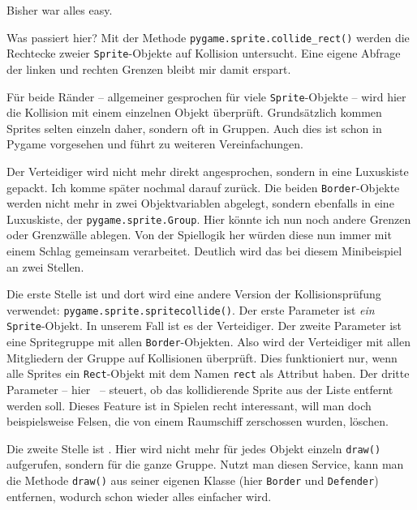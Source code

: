 Bisher war alles easy. 


Was passiert hier? Mit der Methode \texttt{pygame.sprite.collide\_rect()} werden die Rechtecke zweier \texttt{Sprite}-Objekte auf Kollision untersucht. Eine eigene Abfrage der linken und rechten Grenzen bleibt mir damit erspart.

Für beide Ränder -- allgemeiner gesprochen für viele \texttt{Sprite}-Objekte -- wird hier die Kollision mit einem einzelnen Objekt überprüft. Grundsätzlich kommen Sprites selten einzeln daher, sondern oft in Gruppen. Auch dies ist schon in Pygame vorgesehen und führt zu weiteren Vereinfachungen.


Der Verteidiger wird nicht mehr direkt angesprochen, sondern in eine Luxuskiste gepackt. Ich komme später nochmal darauf zurück. Die beiden \texttt{Border}-Objekte werden nicht mehr in zwei Objektvariablen abgelegt, sondern ebenfalls in eine Luxuskiste, der \texttt{pygame.sprite.Group}. Hier könnte ich nun noch andere Grenzen oder Grenzwälle ablegen. Von der Spiellogik her würden diese nun immer mit einem Schlag gemeinsam verarbeitet. Deutlich wird das bei diesem Minibeispiel an zwei Stellen.

Die erste Stelle ist  und dort wird eine andere Version der Kollisionsprüfung verwendet: \texttt{pygame.sprite.\-sprite\-collide()}. Der erste Parameter ist \emph{ein} \texttt{Sprite}-Objekt. In unserem Fall ist es der Verteidiger. Der zweite Parameter ist eine Spritegruppe mit allen \texttt{Border}-Objekten. Also wird der Verteidiger mit allen Mitgliedern der Gruppe auf Kollisionen überprüft. Dies funktioniert nur, wenn alle Sprites ein \texttt{Rect}-Objekt mit dem Namen \texttt{rect} als Attribut haben. Der dritte Parameter -- hier \false\ -- steuert, ob das kollidierende Sprite aus der Liste entfernt werden soll. Dieses Feature ist in Spielen recht interessant, will man doch beispielsweise Felsen, die von einem Raumschiff zerschossen wurden, löschen.

Die zweite Stelle ist . Hier wird nicht mehr für jedes Objekt einzeln \texttt{draw()} aufgerufen, sondern für die ganze Gruppe. Nutzt man diesen Service, kann man die Methode \texttt{draw()} aus seiner eigenen Klasse (hier \texttt{Border} und \texttt{Defender}) entfernen, wodurch schon wieder alles einfacher wird.

